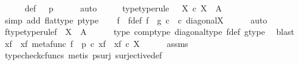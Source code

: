 \begin{isabellebody}
\ \ \isamarkupfalse%
\ {\isasymphi}\ \ {\isasymphi}{\isacharunderscore}{\kern0pt}def{\isacharcolon}{\kern0pt}\ {\isachardoublequoteopen}{\isasymphi}\ {\isacharequal}{\kern0pt}\ p\isactrlsup {\isasymflat}{\isachardoublequoteclose}\isanewline
\ \ \ \ \isamarkupfalse%
\ auto\isanewline
\ \ \isamarkupfalse%
\ \isamarkupfalse%
\ {\isasymphi}{\isacharunderscore}{\kern0pt}type{\isacharbrackleft}{\kern0pt}type{\isacharunderscore}{\kern0pt}rule{\isacharbrackright}{\kern0pt}{\isacharcolon}{\kern0pt}\ {\isachardoublequoteopen}{\isasymphi}\ {\isacharcolon}{\kern0pt}\ X\ {\isasymtimes}\isactrlsub c\ X\ {\isasymrightarrow}\ A{\isachardoublequoteclose}\isanewline
\ \ \ \ \isamarkupfalse%
\ {\isacharparenleft}{\kern0pt}simp\ add{\isacharcolon}{\kern0pt}\ flat{\isacharunderscore}{\kern0pt}type\ p{\isacharunderscore}{\kern0pt}type{\isacharparenright}{\kern0pt}\isanewline
\ \ \isamarkupfalse%
\ f\ \ f{\isacharunderscore}{\kern0pt}def{\isacharcolon}{\kern0pt}\ {\isachardoublequoteopen}f\ {\isacharequal}{\kern0pt}\ g\ {\isasymcirc}\isactrlsub c\ {\isasymphi}\ {\isasymcirc}\isactrlsub c\ diagonal{\isacharparenleft}{\kern0pt}X{\isacharparenright}{\kern0pt}{\isachardoublequoteclose}\isanewline
\ \ \ \ \isamarkupfalse%
\ auto\isanewline
\ \ \isamarkupfalse%
\ \isamarkupfalse%
\ f{\isacharunderscore}{\kern0pt}type{\isacharbrackleft}{\kern0pt}type{\isacharunderscore}{\kern0pt}rule{\isacharbrackright}{\kern0pt}{\isacharcolon}{\kern0pt}{\isachardoublequoteopen}f\ {\isacharcolon}{\kern0pt}\ X\ {\isasymrightarrow}\ A{\isachardoublequoteclose}\isanewline
\ \ \ \ \isamarkupfalse%
\ {\isasymphi}{\isacharunderscore}{\kern0pt}type\ comp{\isacharunderscore}{\kern0pt}type\ diagonal{\isacharunderscore}{\kern0pt}type\ f{\isacharunderscore}{\kern0pt}def\ g{\isacharunderscore}{\kern0pt}type\ \isamarkupfalse%
\ blast\isanewline
\ \ \isamarkupfalse%
\ x{\isacharunderscore}{\kern0pt}f\ \ x{\isacharunderscore}{\kern0pt}f{\isacharcolon}{\kern0pt}\ {\isachardoublequoteopen}metafunc\ f\ {\isacharequal}{\kern0pt}\ p\ {\isasymcirc}\isactrlsub c\ x{\isacharunderscore}{\kern0pt}f\ {\isasymand}\ x{\isacharunderscore}{\kern0pt}f\ {\isasymin}\isactrlsub c\ X{\isachardoublequoteclose}\isanewline
\ \ \ \ \isamarkupfalse%
\ assms\ \isamarkupfalse%
\ {\isacharparenleft}{\kern0pt}typecheck{\isacharunderscore}{\kern0pt}cfuncs{\isacharcomma}{\kern0pt}\ metis\ p{\isacharunderscore}{\kern0pt}surj\ surjective{\isacharunderscore}{\kern0pt}def{}{\isacharparenright}{\kern0pt}\isanewline

\end{isabellebody}
